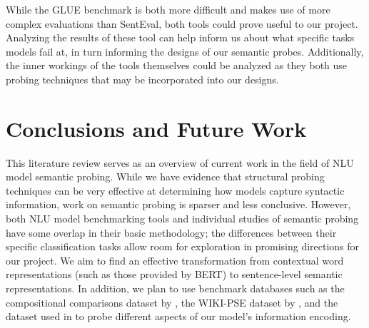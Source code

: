 \documentclass[11pt,a4paper]{article}
\begin{document}
While the GLUE benchmark is both more difficult and makes use of more complex evaluations than SentEval, both tools could prove useful to our project. Analyzing the results of these tool can help inform us about what specific tasks models fail at, in turn informing the designs of our semantic probes. Additionally, the inner workings of the tools themselves could be analyzed as they both use probing techniques that may be incorporated into our designs.

\section{Conclusions and Future Work}
This literature review serves as an overview of current work in the field of NLU model semantic probing. While we have evidence that structural probing techniques can be very effective at determining how models capture syntactic information, work on semantic probing is sparser and less conclusive. However, both NLU model benchmarking tools and individual studies of semantic probing have some overlap in their basic methodology; the differences between their specific classification tasks allow room for exploration in promising directions for our project. We aim to find an effective transformation from contextual word representations (such as those provided by BERT) to sentence-level semantic representations. In addition, we plan to use benchmark databases such as the compositional comparisons dataset by \cite{dasgupta2018comp}, the WIKI-PSE dataset by \cite{yaghoob2019probing}, and the dataset used in \cite{niven2019probing} to probe different aspects of our model's information encoding.
 


\end{document}

